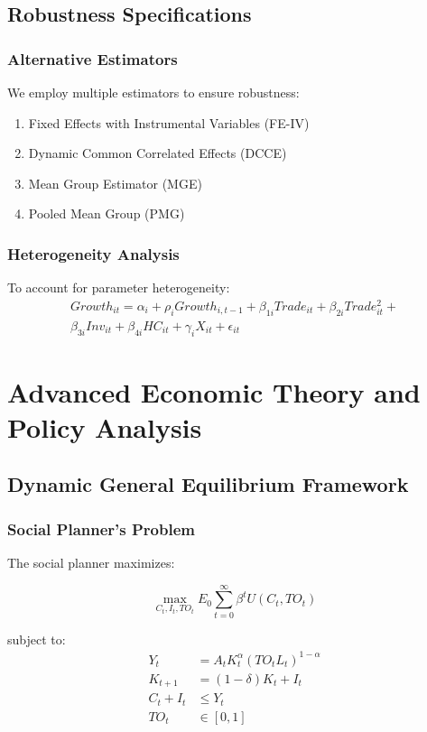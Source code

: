 \documentclass[12pt,a4paper]{article}
\theoremstyle{definition}
\begin{document}
\subsection{Robustness Specifications}
\subsubsection{Alternative Estimators}
We employ multiple estimators to ensure robustness:
\begin{enumerate}
    \item Fixed Effects with Instrumental Variables (FE-IV)
    \item Dynamic Common Correlated Effects (DCCE)
    \item Mean Group Estimator (MGE)
    \item Pooled Mean Group (PMG)
\end{enumerate}

\subsubsection{Heterogeneity Analysis}
To account for parameter heterogeneity:
\begin{equation}
\begin{split}
Growth_{it} = \alpha_i + \rho_i Growth_{i,t-1} + \beta_{1i} Trade_{it} + \beta_{2i} Trade_{it}^2 + \\
\beta_{3i} Inv_{it} + \beta_{4i} HC_{it} + \gamma_i X_{it} + \epsilon_{it}
\end{split}
\end{equation}

\section{Advanced Economic Theory and Policy Analysis}
\subsection{Dynamic General Equilibrium Framework}
\subsubsection{Social Planner's Problem}
The social planner maximizes:

\begin{equation}
\max_{C_t, I_t, TO_t} E_0 \sum_{t=0}^{\infty} \beta^t U(C_t, TO_t)
\end{equation}

subject to:
\begin{align}
Y_t &= A_t K_t^\alpha (TO_t L_t)^{1-\alpha} \\
K_{t+1} &= (1-\delta)K_t + I_t \\
C_t + I_t &\leq Y_t \\
TO_t &\in [0,1]
\end{align}
\end{document}
